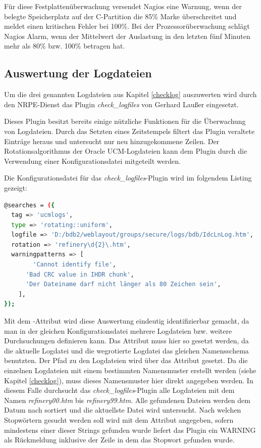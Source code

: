 Für diese Festplattenüberwachung versendet Nagios eine Warnung, wenn der belegte Speicherplatz auf der C-Partition die 85\% Marke überschreitet und meldet einen kritischen Fehler bei 100\%.
Bei der Prozessorüberwachung schlägt Nagios Alarm, wenn der Mittelwert der Auslastung in den letzten fünf Minuten mehr als 80\% bzw. 100\%  betragen hat.




\subsection{Auswertung der Logdateien}

Um die drei genannten Logdateien aus Kapitel \ref{checklog} auszuwerten wird durch den \gls{NRPE}-Dienst das Plugin \textit{check\_logfiles} von Gerhard Laußer eingesetzt.

Dieses Plugin besitzt bereits einige nützliche Funktionen für die Überwachung von Logdateien.
Durch das Setzten eines Zeitstempels filtert das Plugin veraltete Einträge heraus und untersucht nur neu hinzugekommene Zeilen.
Der Rotationsalgorithmus der Oracle UCM-Logdateien kann dem Plugin durch die Verwendung einer Konfigurationsdatei mitgeteilt werden.

Die Konfigurationsdatei für das \textit{check\_logfiles}-Plugin wird im folgendem Listing gezeigt:


\begin{lstlisting}[captionpos=b, caption=Konfigurationsdatei für \textit{check\_logfiles}, label=chklogcfg, breaklines = true, language=sh]
@searches = ({
  tag => 'ucmlogs',
  type => 'rotating::uniform',
  logfile => 'D:/bdb2/weblayout/groups/secure/logs/bdb/IdcLnLog.htm',
  rotation => 'refinery\d{2}\.htm',
  warningpatterns => [
        'Cannot identify file',
	  'Bad CRC value in IHDR chunk',
	  'Der Dateiname darf nicht länger als 80 Zeichen sein',
    ],
});
\end{lstlisting}

Mit dem -Attribut wird diese Auswertung eindeutig identifizierbar gemacht, da man in der gleichen Konfigurationsdatei mehrere Logdateien bzw. weitere Durchsuchungen definieren kann.
Das Attribut  muss hier so gesetzt werden, da die aktuelle Logdatei und die wegrotierte Logdatei das gleichen Namensschema benutzten.
Der Pfad zu den Logdateien wird über das Attribut  gesetzt.
Da die einzelnen Logdateien mit einem bestimmten Namensmuster erstellt werden (siehe Kapitel \ref{checklog}), muss dieses Namensmuster hier direkt angegeben werden.
In diesem Falle durchsucht das \textit{check\_logfiles}-Plugin alle Logdateien mit dem Namen \textit{refinery00.htm} bis \textit{refinery99.htm}.
Alle gefundenen Dateien werden dem Datum nach sortiert und die aktuellste Datei wird untersucht.
Nach welchen Stopwörtern gesucht werden soll wird mit dem Attribut  angegeben, sofern mindestens einer dieser Strings gefunden wurde liefert das Plugin ein WARNING als Rückmeldung inklusive der Zeile in dem das Stopwort gefunden wurde.


